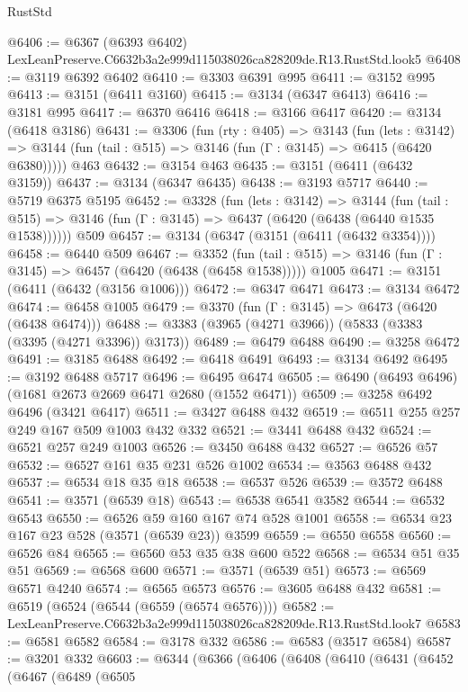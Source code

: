 \begin{lexlean}{RustStd}
\begin{coremodule}
@6406 := @6367 (@6393 @6402) LexLeanPreserve.C6632b3a2e999d115038026ca828209de.R13.RustStd.look5
@6408 := @3119 @6392 @6402
@6410 := @3303 @6391 @995
@6411 := @3152 @995
@6413 := @3151 (@6411 @3160)
@6415 := @3134 (@6347 @6413)
@6416 := @3181 @995
@6417 := @6370 @6416
@6418 := @3166 @6417
@6420 := @3134 (@6418 @3186)
@6431 := @3306
    (fun (rty : @405) =>
    @3143
      (fun (lets : @3142) =>
      @3144 (fun (tail : @515) => @3146 (fun (Γ : @3145) => @6415 (@6420 @6380)))))
    @463
@6432 := @3154 @463
@6435 := @3151 (@6411 (@6432 @3159))
@6437 := @3134 (@6347 @6435)
@6438 := @3193 @5717
@6440 := @5719 @6375 @5195
@6452 := @3328
    (fun (lets : @3142) =>
    @3144
      (fun (tail : @515) => @3146 (fun (Γ : @3145) => @6437 (@6420 (@6438 (@6440 @1535 @1538))))))
    @509
@6457 := @3134 (@6347 (@3151 (@6411 (@6432 @3354))))
@6458 := @6440 @509
@6467 := @3352
    (fun (tail : @515) => @3146 (fun (Γ : @3145) => @6457 (@6420 (@6438 (@6458 @1538)))))
    @1005
@6471 := @3151 (@6411 (@6432 (@3156 @1006)))
@6472 := @6347 @6471
@6473 := @3134 @6472
@6474 := @6458 @1005
@6479 := @3370 (fun (Γ : @3145) => @6473 (@6420 (@6438 @6474)))
@6488 := @3383 (@3965 (@4271 @3966)) (@5833 (@3383 (@3395 (@4271 @3396)) @3173))
@6489 := @6479 @6488
@6490 := @3258 @6472
@6491 := @3185 @6488
@6492 := @6418 @6491
@6493 := @3134 @6492
@6495 := @3192 @6488 @5717
@6496 := @6495 @6474
@6505 := @6490 (@6493 @6496) (@1681 @2673 @2669 @6471 @2680 (@1552 @6471))
@6509 := @3258 @6492 @6496 (@3421 @6417)
@6511 := @3427 @6488 @432
@6519 := @6511 @255 @257 @249 @167 @509 @1003 @432 @332
@6521 := @3441 @6488 @432
@6524 := @6521 @257 @249 @1003
@6526 := @3450 @6488 @432
@6527 := @6526 @57
@6532 := @6527 @161 @35 @231 @526 @1002
@6534 := @3563 @6488 @432
@6537 := @6534 @18 @35 @18
@6538 := @6537 @526
@6539 := @3572 @6488
@6541 := @3571 (@6539 @18)
@6543 := @6538 @6541 @3582
@6544 := @6532 @6543
@6550 := @6526 @59 @160 @167 @74 @528 @1001
@6558 := @6534 @23 @167 @23 @528 (@3571 (@6539 @23)) @3599
@6559 := @6550 @6558
@6560 := @6526 @84
@6565 := @6560 @53 @35 @38 @600 @522
@6568 := @6534 @51 @35 @51
@6569 := @6568 @600
@6571 := @3571 (@6539 @51)
@6573 := @6569 @6571 @4240
@6574 := @6565 @6573
@6576 := @3605 @6488 @432
@6581 := @6519 (@6524 (@6544 (@6559 (@6574 @6576))))
@6582 := LexLeanPreserve.C6632b3a2e999d115038026ca828209de.R13.RustStd.look7
@6583 := @6581 @6582
@6584 := @3178 @332
@6586 := @6583 (@3517 @6584)
@6587 := @3201 @332
@6603 := @6344
    (@6366
      (@6406
        (@6408
          (@6410
            (@6431
              (@6452
                (@6467
                  (@6489
                    (@6505

\end{coremodule}
\end{lexlean}
